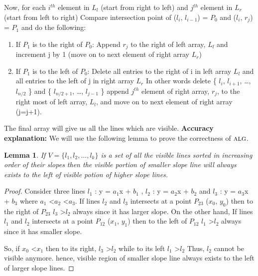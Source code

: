 \documentclass[11pt]{article}
\newcommand{\alg}{\textsc{alg}}
\newtheorem{lemma}[theorem]{Lemma}
\begin{document}
Now, for each $i^{th}$ element in $L_l$ (start from right to left) and $j^{th}$ element in $L_r$ (start from left to right) \newline
Compare intersection point of ($l_i$, $l_{i-1}$) = $P_0$ and  ($l_i$, $r_j$) = $P_1$ and do the following: \newline
\begin{enumerate}
\item If $P_1$ is to the right of $P_0$: \newline
Append $r_j$ to the right of left array, $L_l$ and increment j by 1 (move on to next element of right array $L_r$) \newline
\item If $P_1$ is to the left of $P_0$: \newline
Delete all entries to the right of i in left array $L_l$ and all entries to the left of j in right array $L_r$ \newline
In other words delete \{ $l_i$, $l_{i+1}$, \dots , $l_{n/2}$ \} and \{ $l_{n/2+1}$, \dots, $l_{j-1}$ \} \newline
append $j^{th}$ element of right array, $r_j$, to the right most of left array, $L_l$, and move on to next
element of right array (j=j+1). \newline
\end{enumerate}
The final array will give us all the lines which are visible.   \newline
{\bf Accuracy explanation:}\newline
We will use the following lemma to prove the correctness of $\alg$.

\begin{lemma}\label{visible-lines-lemma}
If $V = \{ l_1, l_2, \dots , l_{k} \}$ is a set of all the visible lines sorted in increasing order of their slopes then
the visible portion of smaller slope line will always exists to the left of visible potion of higher slope lines.
\end{lemma}

\begin{proof}
Consider three lines $l_1$ : y = $a_1$x + $b_1$ , $l_2$ : y = $a_2$x + $b_2$ 
and $l_3$ : y = $a_3$x + $b_3$  where $a_1$ \textless $a_2$ \textless $a_3$.
If lines $l_2$ and $l_3$ intersects at a point $P_{23}$ ($x_0$, $y_0$) then to the right of $P_23$
$l_3$ \textgreater $l_2$ always since it has larger slope. \newline
On the other hand, If lines $l_1$ and $l_2$ intersects at a point $P_{12}$ ($x_1$, $y_1$) then to the left of $P_{12}$
$l_1$ \textgreater $l_2$ always since it has smaller slope. \newline

So, if $x_0$ \textless $x_1$ then to its right, $l_3$ \textgreater $l_2$ while to its left $l_1$ \textgreater $l_2$ \newline
Thus, $l_2$ cannot be visible anymore.\newline
hence, visible region of smaller slope line always exists to the left of larger slope lines.
\end{proof}
\end{document}

